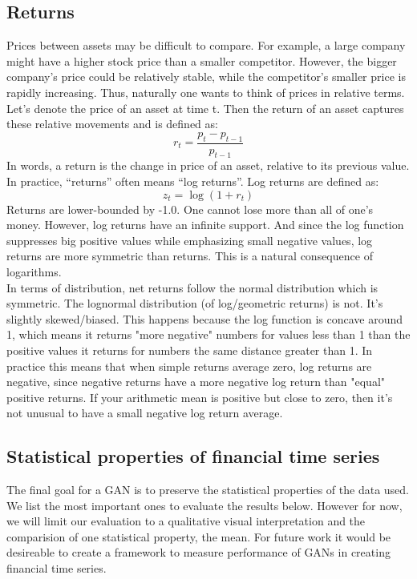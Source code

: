 \documentclass{article}
\begin{document}
\begin{multicols}{2}
    \subsection*{Returns}
    Prices between assets may be difficult to compare. For example, a large company might have a higher stock price than a smaller competitor. However, the bigger company's price could be relatively stable, while the competitor's smaller price is rapidly increasing. Thus, naturally one wants to think of prices in relative terms. Let's denote the price of an asset at time t. Then the return of an asset captures these relative movements and is defined as:
    $$r_t = \frac{p_t - p_{t-1}}{p_{t-1}}$$
    In words, a return is the change in price of an asset, relative to its previous value. In practice, “returns” often means “log returns”. Log returns are defined as:
    $$z_t = \log(1+r_t)$$
    Returns are lower-bounded by -1.0. One cannot lose more than all of one's money. However, log returns have an infinite support. And since the log function suppresses big positive values while emphasizing small negative values, log returns are more symmetric than returns. This is a natural consequence of logarithms.\\
    In terms of distribution, net returns follow the normal distribution which is symmetric. The lognormal distribution (of log/geometric returns) is not. It's slightly skewed/biased. This happens because the log function is concave around 1, which means it returns "more negative" numbers for values less than 1 than the positive values it returns for numbers the same distance greater than 1. In practice this means that when simple returns average zero, log returns are negative, since negative returns have a more negative log return than "equal" positive returns. If your arithmetic mean is positive but close to zero, then it's not unusual to have a small negative log return average. 
    
    \subsection*{Statistical properties of financial time series}
    The final goal for a GAN is to preserve the statistical properties of the data used. We list the most important ones to evaluate the results below. However for now, we will limit our evaluation to a qualitative visual interpretation and the comparision of one statistical property, the mean. For future work it would be desireable to create a framework to measure performance of GANs in creating financial time series.\\

\end{multicols}
\end{document}
